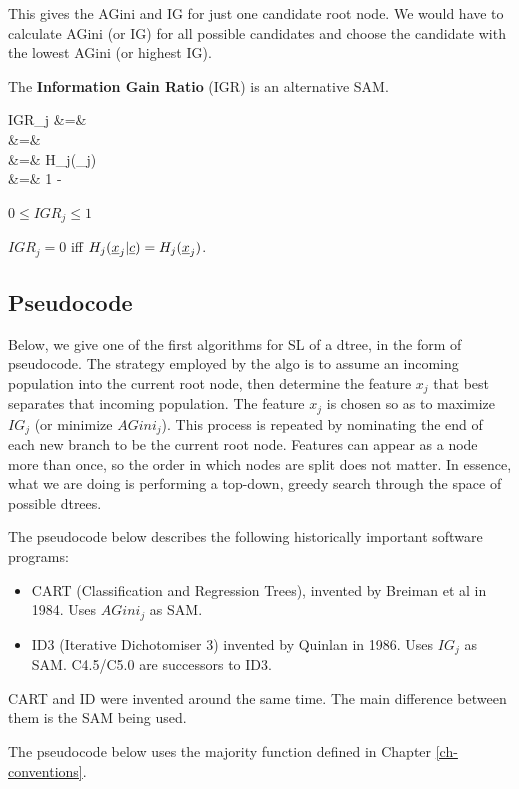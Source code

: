 This gives
the AGini and IG for just one 
candidate root node.
We would have
to calculate
AGini (or IG) for all
possible candidates
and choose the candidate
with the lowest AGini (or highest IG).

The {\bf Information Gain Ratio} (IGR) is an alternative SAM.

\beqa
IGR_j
&=&
\\
&=&
\\
&=&
{H_j(\rvx_j)}
\\
&=&
1 -\;
\eeqa

$0\leq IGR_j\leq 1$

$IGR_j=0$ iff $H_j(\rvx_j |\rvc)=H_j(\rvx_j)$.




\subsection{Pseudocode}

Below,
we give one of the first
algorithms for SL
of a dtree, in the form
of pseudocode.
The strategy
employed by
the algo
is to assume an incoming
population into the current root node,
then
determine the feature $x_j$
 that best separates that 
incoming
population. The feature
$x_j$ is chosen so as to maximize
$IG_j$
(or minimize $AGini_j$). This
process is repeated by nominating
the end of each new branch to be
the current root node.
Features can appear as a node 
more than once, so the order in 
which nodes are split does not matter.
In essence, what we are doing is
performing a top-down, greedy search
through the space of possible dtrees.

The pseudocode below describes the following 
historically important
software programs:
\begin{itemize}
\item CART (Classification and Regression Trees),
invented by Breiman et al in 1984. Uses $AGini_j$ as SAM.
\item
ID3 (Iterative Dichotomiser 3)
invented by Quinlan in 1986. Uses $IG_j$ as SAM.
C4.5/C5.0 are successors to ID3.
\end{itemize}

CART and ID were 
invented around the same time.
The main difference between them is the SAM
being used.


The pseudocode below
uses the majority function
defined in Chapter \ref{ch-conventions}.


